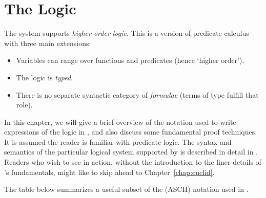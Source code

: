 \chapter{The \HOL{} Logic}\label{HOLlogic}

The \HOL{}  system  supports \emph{higher order logic}.
This is a version of predicate calculus with three main extensions:

\begin{itemize}
\item Variables can range over functions and predicates (hence `higher order').
\item The logic is \emph{typed}.
\item There is no separate syntactic category of \emph{formulae} (terms of type  fulfill that role).
\end{itemize}

In this chapter, we will give a brief overview of the notation used to write expressions of the \HOL{} logic in \ML{}, and also discuss some fundamental  \HOL{} proof techniques.
It is assumed the reader is familiar with predicate logic.
The syntax and semantics of the particular logical system supported by \HOL{} is described in detail in \DESCRIPTION.
Readers who wish to see \HOL{} in action, without the introduction to the finer details of \HOL's fundamentals, might like to skip ahead to Chapter~\ref{chap:euclid}.


The table below summarizes a useful subset of the (ASCII) notation used in \HOL.

